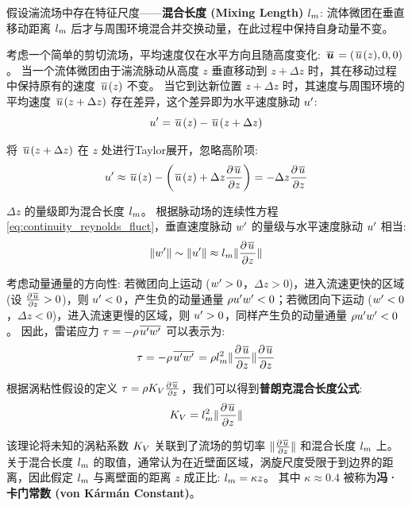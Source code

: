 假设湍流场中存在特征尺度——\textbf{混合长度 (Mixing Length)} $l_m$: 流体微团在垂直移动距离 $l_m$ 后才与周围环境混合并交换动量，在此过程中保持自身动量不变。

考虑一个简单的剪切流场，平均速度仅在水平方向且随高度变化: $\mkern2mu \overline{\bm{u}} \mkern2mu = (\mkern2mu \overline{u} \mkern2mu(z), 0, 0)$。
当一个流体微团由于湍流脉动从高度 $z$ 垂直移动到 $z + \Delta z$ 时，其在移动过程中保持原有的速度 $\mkern2mu \overline{u} \mkern2mu(z)$ 不变。
当它到达新位置 $z + \Delta z$ 时，其速度与周围环境的平均速度 $\mkern2mu \overline{u} \mkern2mu(z + \Delta z)$ 存在差异，这个差异即为水平速度脉动 $u'$:
\begin{equation*}
    u' = \mkern2mu \overline{u} \mkern2mu(z) - \mkern2mu \overline{u} \mkern2mu(z + \Delta z)
\end{equation*}

将 $\mkern2mu \overline{u} \mkern2mu(z + \Delta z)$ 在 $z$ 处进行Taylor展开，忽略高阶项:
\begin{equation*}
    \fluct{u} \approx \mean{u}(z) - \left(\mean{u}(z) + \Delta z \pde{\mean{u}}{z}\right) = - \Delta z \pde{\mean{u}}{z}
\end{equation*}

$\Delta z$ 的量级即为混合长度 $l_m$。
根据脉动场的连续性方程 \eqref{eq:continuity_reynolds_fluct}，垂直速度脉动 $w'$ 的量级与水平速度脉动 $u'$ 相当:
\begin{equation*}
    \norm{\fluct{w}} \sim \norm{\fluct{u}} \approx \mixinglength \norm{\pde{\mean{u}}{z}}
\end{equation*}

考虑动量通量的方向性: 若微团向上运动 ($w' > 0$，$\Delta z > 0$)，进入流速更快的区域 (设 $\pde{\mean{u}}{z} > 0$)，则 $u' < 0$，产生负的动量通量 $\rho u' w' < 0$；若微团向下运动 ($w' < 0$，$\Delta z < 0$)，进入流速更慢的区域，则 $u' > 0$，同样产生负的动量通量 $\rho u'w' < 0$。
因此，雷诺应力 $\tau = -\rho \mkern2mu \overline{u'w'} \mkern2mu$ 可以表示为:
\begin{equation*}
    \tau = -\density \mean{\fluct{u}\fluct{w}} = \density \mixinglength^2 \norm{\pde{\mean{u}}{z}} \pde{\mean{u}}{z}
\end{equation*}

根据涡粘性假设的定义 $\tau = \density \eddyviscv \pde{\mean{u}}{z}$，我们可以得到\textbf{普朗克混合长度公式}:
\begin{equation}
    \eddyviscv = \mixinglength^2 \norm{\pde{\mean{u}}{z}}
    \label{eq:prandtl_mixing_length}
\end{equation}

该理论将未知的涡粘系数 $K_V$ 关联到了流场的剪切率 $\norm{\pde{\mean{u}}{z}}$ 和混合长度 $l_m$ 上。
关于混合长度 $l_m$ 的取值，通常认为在近壁面区域，涡旋尺度受限于到边界的距离，因此假定 $l_m$ 与离壁面的距离 $z$ 成正比: $l_m = \kappa z$。
其中 $\kappa \approx 0.4$ 被称为\textbf{冯·卡门常数 (von Kármán Constant)}。

